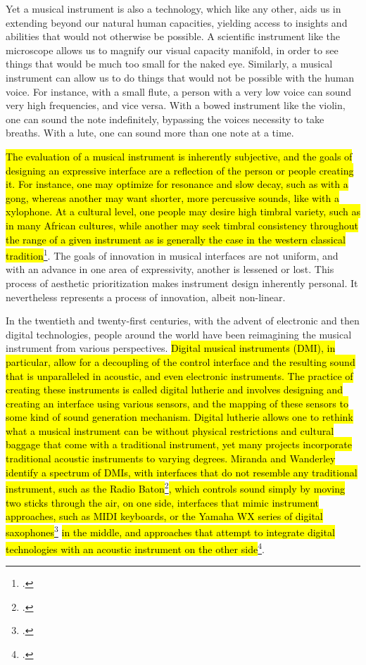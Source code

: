 \documentclass[12pt,twoside,maitrise]{dms_ks}
\theoremstyle{definition}
\begin{document}
Yet a musical instrument is also a technology, which like any other, aids us in extending beyond our natural human capacities, yielding access to insights and abilities that would not otherwise be possible. 
A scientific instrument like the microscope allows us to magnify our visual capacity manifold, in order to see things that would be much too small for the naked eye. 
Similarly, a musical instrument can allow us to do things that would not be possible with the human voice. 
For instance, with a small flute, a person with a very low voice can sound very high frequencies, and vice versa. 
With a bowed instrument like the violin, one can sound the note indefinitely, bypassing the voices necessity to take breaths. 
With a lute, one can sound more than one note at a time. 

\hl{The evaluation of a musical instrument is inherently subjective, and the goals of designing an expressive interface are a reflection of the person or people creating it. 
For instance, one may optimize for resonance and slow decay, such as with a gong, whereas another may want shorter, more percussive sounds, like with a xylophone. 
At a cultural level, one people may desire high timbral variety, such as in many African cultures, while another may seek timbral consistency throughout the range of a given instrument as is generally the case in the western classical tradition}\footcite[69]{fales_fusion_1994}.
The goals of innovation in musical interfaces are not uniform, and with an advance in one area of expressivity, another is lessened or lost. 
This process of aesthetic prioritization makes instrument design inherently personal. It nevertheless represents a process of innovation, albeit non-linear. 


In the twentieth and twenty-first centuries, with the advent of electronic and then digital technologies, people around the world have been reimagining the musical instrument from various perspectives. 
\hl{Digital musical instruments (DMI), in particular, allow for a decoupling of the control interface and the resulting sound that is unparalleled in acoustic, and even electronic instruments.
The practice of creating these instruments is called digital lutherie and involves designing and creating an interface using various sensors, and the mapping of these sensors to some kind of sound generation mechanism.
Digital lutherie allows one to rethink what a musical instrument can be without physical restrictions and cultural baggage that come with a traditional instrument, yet many projects incorporate traditional acoustic instruments to varying degrees. 
Miranda and Wanderley identify a spectrum of DMIs, with interfaces that do not resemble any traditional instrument, such as the Radio Baton}\footcite{miguel_ragussi_max_2013}\hl{, which controls sound simply by moving two sticks through the air, on one side, interfaces that mimic instrument approaches, such as MIDI keyboards, or the Yamaha WX series of digital saxophones}\footcite{mkirino01_yamaha_2014}\hl{ in the middle, and approaches that attempt to integrate digital technologies with an acoustic instrument on the other side}\footcite[19-20]{miranda_new_2006}.
\end{document}
